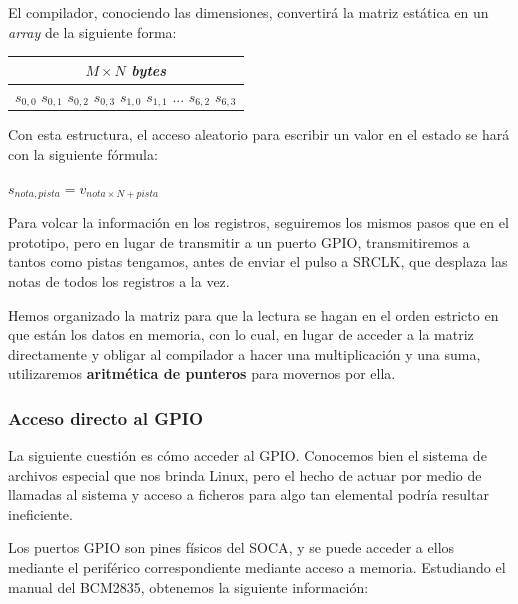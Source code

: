 \smallskip

El compilador, conociendo las dimensiones, convertirá la matriz estática en un \textit{array} de la siguiente forma:

\smallskip

\begin{center}
	\begin{tabular}{|c|}
		\hline $M\times N$ \textit{bytes} \\
		\hline $s_{0,0}$ $s_{0,1}$ $s_{0,2}$ $s_{0,3}$ $s_{1,0}$ $s_{1,1}$ ... $s_{6,2}$  $s_{6,3}$ \\
		\hline 
	\end{tabular}
	\smallskip
\end{center}

\smallskip

Con esta estructura, el acceso aleatorio para escribir un valor en el estado se hará con la siguiente fórmula:

\begin{center}
	$s_{nota,pista} = v_{nota \times N + pista}$
\end{center}

Para volcar la información en los registros, seguiremos los mismos pasos que en el prototipo, pero en lugar de transmitir a un puerto \acrshort{GPIO}, transmitiremos a tantos como pistas tengamos, antes de enviar el pulso a SRCLK, que desplaza las notas de todos los registros a la vez.

Hemos organizado la matriz para que la lectura se hagan en el orden estricto en que están los datos en memoria, con lo cual, en lugar de acceder a la matriz directamente y obligar al compilador a hacer una multiplicación y una suma, utilizaremos \textbf{aritmética de punteros} para movernos por ella.

\subsubsection{Acceso directo al GPIO}

La siguiente cuestión es cómo acceder al \acrshort{GPIO}. Conocemos bien el sistema de archivos especial que nos brinda Linux, pero el hecho de actuar por medio de llamadas al sistema y acceso a ficheros para algo tan elemental podría resultar ineficiente.

Los puertos \acrshort{GPIO} son pines físicos del \acrshort{SOCA}, y se puede acceder a ellos mediante el periférico correspondiente mediante acceso a memoria. Estudiando el manual del BCM2835, obtenemos la siguiente información:

